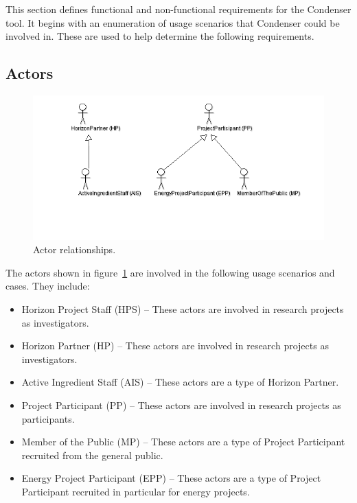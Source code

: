 This section defines functional and non-functional requirements for the Condenser tool. It begins with an enumeration of usage scenarios that Condenser could be involved in. These are used to help determine the following requirements.

\subsection{Actors}
\begin{center}
	\begin{figure}[htbp]
		\includegraphics[scale=.5]{images/ActorRelationships.png}
		\caption{Actor relationships.\label{ActorRelationships}}
	\end{figure}
\end{center}	
The actors shown in figure~\ref{ActorRelationships} are involved in the following usage scenarios and cases. They include:
\begin{itemize}
	\item Horizon Project Staff (HPS) -- These actors are involved in research projects as investigators.
	\item Horizon Partner (HP) -- These actors are involved in research projects as investigators. 
	\item Active Ingredient Staff (AIS) -- These actors are a type of Horizon Partner. 
	\item Project Participant (PP) -- These actors are involved in research projects as participants. 
	\item Member of the Public (MP) -- These actors are a type of Project Participant recruited from the general public.
	\item Energy Project Participant (EPP) -- These actors are a type of Project Participant recruited in particular for energy projects.
\end{itemize}


